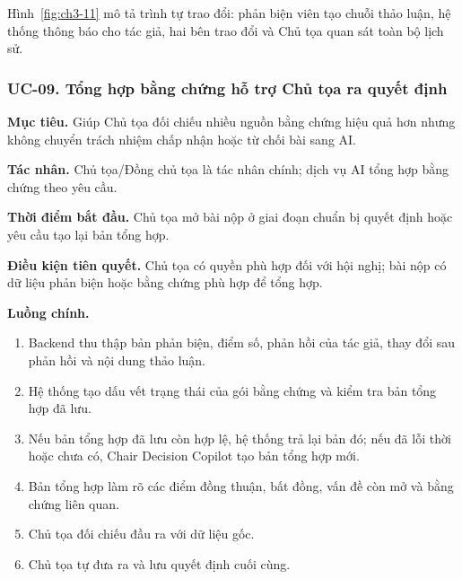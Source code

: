Hình~\ref{fig:ch3-11} mô tả trình tự trao đổi: phản biện viên tạo chuỗi thảo luận, hệ thống thông báo cho tác giả, hai bên trao đổi và Chủ tọa quan sát toàn bộ lịch sử.





\subsubsection{UC-09. Tổng hợp bằng chứng hỗ trợ Chủ tọa ra quyết định}

\textbf{Mục tiêu.} Giúp Chủ tọa đối chiếu nhiều nguồn bằng chứng hiệu quả hơn nhưng không chuyển trách nhiệm chấp nhận hoặc từ chối bài sang AI.

\textbf{Tác nhân.} Chủ tọa/Đồng chủ tọa là tác nhân chính; dịch vụ AI tổng hợp bằng chứng theo yêu cầu.

\textbf{Thời điểm bắt đầu.} Chủ tọa mở bài nộp ở giai đoạn chuẩn bị quyết định hoặc yêu cầu tạo lại bản tổng hợp.

\textbf{Điều kiện tiên quyết.} Chủ tọa có quyền phù hợp đối với hội nghị; bài nộp có dữ liệu phản biện hoặc bằng chứng phù hợp để tổng hợp.

\textbf{Luồng chính.}

\begin{enumerate}
  \item Backend thu thập bản phản biện, điểm số, phản hồi của tác giả, thay đổi sau phản hồi và nội dung thảo luận.
  \item Hệ thống tạo dấu vết trạng thái của gói bằng chứng và kiểm tra bản tổng hợp đã lưu.
  \item Nếu bản tổng hợp đã lưu còn hợp lệ, hệ thống trả lại bản đó; nếu đã lỗi thời hoặc chưa có, Chair Decision Copilot tạo bản tổng hợp mới.
  \item Bản tổng hợp làm rõ các điểm đồng thuận, bất đồng, vấn đề còn mở và bằng chứng liên quan.
  \item Chủ tọa đối chiếu đầu ra với dữ liệu gốc.
  \item Chủ tọa tự đưa ra và lưu quyết định cuối cùng.
\end{enumerate}

